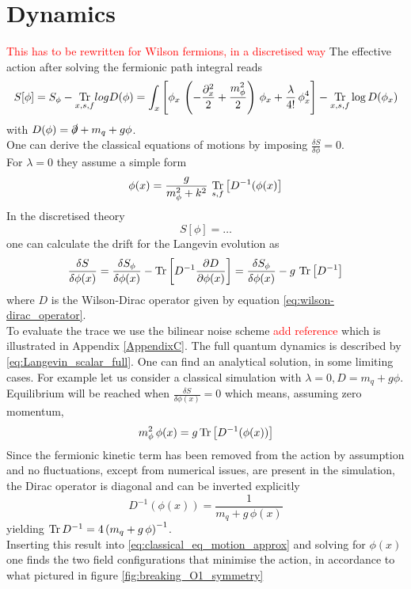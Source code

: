 \section{Dynamics}
\textcolor{red}{This has to be rewritten for Wilson fermions, in a discretised way}
The effective action after solving the fermionic path integral reads
\begin{equation*}
    S[\phi] = S_\phi - \underset{x,s,f}{\operatorname{\text{Tr}}}log{D(\phi)} = \int_x \left[ \phi_x \, \left(-\frac{\partial_x^2}{2} + \frac{m_\phi^2}{2}\right) \, \phi_x + \frac{\lambda}{4!} \, \phi_x^4 \right] - \underset{x,s,f}{\operatorname{\text{Tr}}}\log{D(\phi_x)}
\end{equation*}
with $D(\phi) = \slashed{\partial} + m_q + g\phi$. \\
One can derive the classical equations of motions by imposing $\frac{\delta S}{\delta \phi} = 0$. \\ For $\lambda = 0$ they assume a simple form
\begin{equation*}
    \phi(x) = \frac{g}{m_\phi^2 + k^2} \ \underset{s,f}{\operatorname{\text{Tr}}} \left[D^{-1}(\phi(x)\right]
\end{equation*}
In the discretised theory
\begin{equation*}
    S[\phi] = \dots
\end{equation*}
one can calculate the drift for the Langevin evolution as
\begin{equation*}
    \frac{\delta S}{\delta \phi(x)} = \frac{\delta S_\phi}{\delta \phi(x)} - \operatorname{\text{Tr}} \left[D^{-1} \frac{\partial D}{\partial \phi(x)}\right] = \frac{\delta S_\phi}{\delta \phi(x)} - g \, \operatorname{\text{Tr}} \left[D^{-1}\right]
\end{equation*}
where $D$ is the Wilson-Dirac operator given by equation \eqref{eq:wilson-dirac_operator}. \\
To evaluate the trace we use the bilinear noise scheme \textcolor{red}{add reference} which is illustrated in Appendix \ref{AppendixC}.
The full quantum dynamics is described by \eqref{eq:Langevin_scalar_full}. One can find an analytical solution, in some limiting cases. For example let us consider a classical simulation with $\lambda = 0, D = m_q + g\phi$. Equilibrium will be reached when $\frac{\delta S}{\delta \phi(x)} = 0$ which means, assuming zero momentum,
\begin{equation*}
    m_\phi^2 \, \phi(x) = g \operatorname{\text{Tr}} \left[D^{-1}(\phi(x))\right]
\end{equation*}
Since the fermionic kinetic term has been removed from the action by assumption and no fluctuations, except from numerical issues, are present in the simulation, the Dirac operator is diagonal and can be inverted explicitly
\begin{equation}
    D^{-1}(\phi(x)) = \frac{1}{m_q + g \, \phi(x)}
    \label{eq:classical_eq_motion_approx}
\end{equation}
yielding $\operatorname{\text{Tr}} D^{-1} =  4 \left(m_q + g \, \phi\right)^{-1}$. \\
Inserting this result into \eqref{eq:classical_eq_motion_approx} and solving for $\phi(x)$ one finds the two field configurations that minimise the action, in accordance to what pictured in figure \ref{fig:breaking_O1_symmetry}

